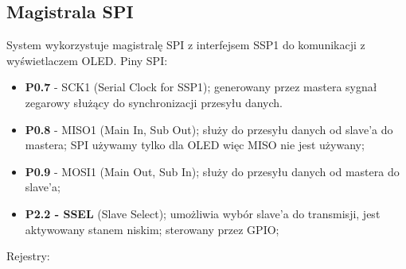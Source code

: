 \subsection{Magistrala SPI}
System wykorzystuje magistralę SPI z interfejsem SSP1 do komunikacji z wyświetlaczem OLED. 
Piny SPI:
\begin{itemize}
\item \textbf{P0.7} - SCK1 (Serial Clock for SSP1); generowany przez mastera sygnał zegarowy służący do synchronizacji przesyłu danych.
\item \textbf{P0.8} - MISO1 (Main In, Sub Out); służy do przesyłu danych od slave'a do mastera; SPI używamy tylko dla OLED więc MISO nie jest używany;
\item \textbf{P0.9} - MOSI1 (Main Out, Sub In); służy do przesyłu danych od mastera do slave'a;
\item \textbf{P2.2 - SSEL} (Slave Select); umożliwia wybór slave’a do transmisji, jest aktywowany stanem niskim; sterowany przez GPIO;
\end{itemize}
Rejestry:
